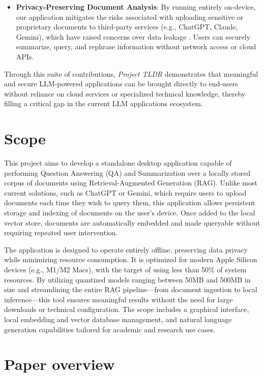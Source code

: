 \begin{itemize}
    \item \textbf{Privacy-Preserving Document Analysis}: By running entirely on-device, our application mitigates the risks associated with uploading sensitive or proprietary documents to third-party services (e.g., ChatGPT, Claude, Gemini), which have raised concerns over data leakage \cite{mattern2023membership,nasr2023extraction}. Users can securely summarize, query, and rephrase information without network access or cloud APIs.

\end{itemize}

Through this suite of contributions, \textit{Project TLDR} demonstrates that meaningful and secure LLM-powered applications can be brought directly to end-users without reliance on cloud services or specialized technical knowledge, thereby filling a critical gap in the current LLM applications ecosystem.


\section{Scope}
\label{sec:Scope}

This project aims to develop a standalone desktop application capable of performing Question Answering (QA) and Summarization over a locally stored corpus of documents using Retrieval-Augmented Generation (RAG). Unlike most current solutions, such as ChatGPT or Gemini, which require users to upload documents each time they wish to query them, this application allows persistent storage and indexing of documents on the user's device. Once added to the local vector store, documents are automatically embedded and made queryable without requiring repeated user intervention.

The application is designed to operate entirely offline, preserving data privacy while minimizing resource consumption. It is optimized for modern Apple Silicon devices (e.g., M1/M2 Macs), with the target of using less than 50\% of system resources. By utilizing quantized models ranging between 50MB and 500MB in size and streamlining the entire RAG pipeline—from document ingestion to local inference—this tool ensures meaningful results without the need for large downloads or technical configuration. The scope includes a graphical interface, local embedding and vector database management, and natural language generation capabilities tailored for academic and research use cases.
\section{Paper overview}
\label{sec:PaperOverview}

